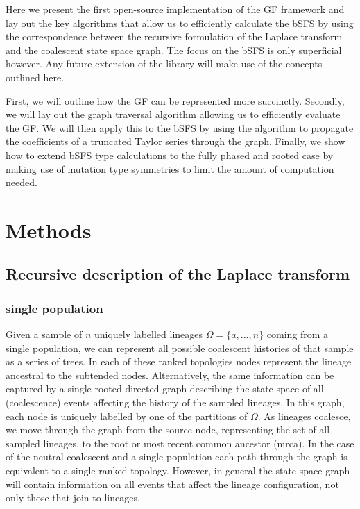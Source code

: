 \documentclass[10pt, a4]{article}
\begin{document}
Here we present the first open-source implementation of the GF framework and lay out the key algorithms that allow us to efficiently calculate the bSFS by using the correspondence between the recursive formulation of the Laplace transform and the coalescent state space graph. The focus on the bSFS is only superficial however. Any future extension of the library will make use of the concepts outlined here.

First, we will outline how the GF can be represented more succinctly. Secondly, we will lay out the graph traversal algorithm allowing us to efficiently evaluate the GF. We will then apply this to the bSFS by using the algorithm to propagate the coefficients of a truncated Taylor series through the graph. Finally, we show how to extend bSFS type calculations to the fully phased and rooted case by making use of mutation type symmetries to limit the amount of computation needed.

\section{Methods}
\subsection{Recursive description of the Laplace transform} \label{GF_description}
\subsubsection{single population}

Given a sample of $n$ uniquely labelled lineages $\Omega = \{a, ..., n\}$ coming from a single population, we can represent all possible coalescent histories of that sample as a series of trees. In each of these ranked topologies nodes represent the lineage ancestral to the subtended nodes. Alternatively, the same information can be captured by a single rooted directed graph describing the state space of all (coalescence) events affecting the history of the sampled lineages. In this graph, each node is uniquely labelled by one of the partitions of $\Omega$. As lineages coalesce, we move through the graph from the source node, representing the set of all sampled lineages, to the root or most recent common ancestor (mrca). In the case of the neutral coalescent and a single population each path through the graph is equivalent to a single ranked topology. However, in general the state space graph will contain information on all events that affect the lineage configuration, not only those that join to lineages. %
\end{document}
